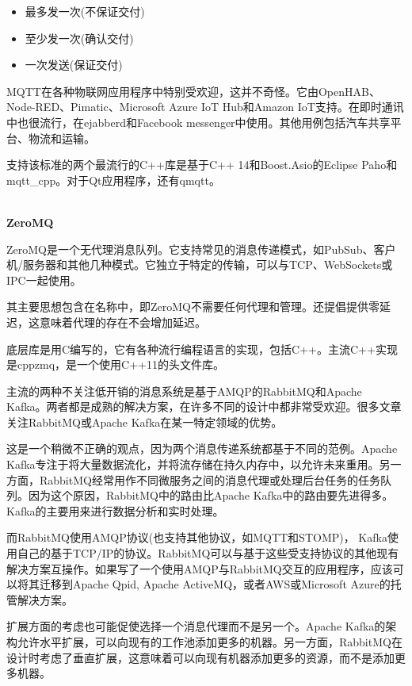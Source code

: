 \begin{itemize}
\item 
最多发一次(不保证交付)

\item 
至少发一次(确认交付)

\item 
一次发送(保证交付)
\end{itemize}

MQTT在各种物联网应用程序中特别受欢迎，这并不奇怪。它由OpenHAB、Node-RED、Pimatic、Microsoft Azure IoT Hub和Amazon IoT支持。在即时通讯中也很流行，在ejabberd和Facebook messenger中使用。其他用例包括汽车共享平台、物流和运输。

支持该标准的两个最流行的C++库是基于C++ 14和Boost.Asio的Eclipse Paho和mqtt\_cpp。对于Qt应用程序，还有qmqtt。

\hspace*{\fill} \\ %
\noindent
\textbf{ZeroMQ}

ZeroMQ是一个无代理消息队列。它支持常见的消息传递模式，如PubSub、客户机/服务器和其他几种模式。它独立于特定的传输，可以与TCP、WebSockets或IPC一起使用。

其主要思想包含在名称中，即ZeroMQ不需要任何代理和管理。还提倡提供零延迟，这意味着代理的存在不会增加延迟。

底层库是用C编写的，它有各种流行编程语言的实现，包括C++。主流C++实现是cppzmq，是一个使用C++11的头文件库。


主流的两种不关注低开销的消息系统是基于AMQP的RabbitMQ和Apache Kafka。两者都是成熟的解决方案，在许多不同的设计中都非常受欢迎。很多文章关注RabbitMQ或Apache Kafka在某一特定领域的优势。

这是一个稍微不正确的观点，因为两个消息传递系统都基于不同的范例。Apache Kafka专注于将大量数据流化，并将流存储在持久内存中，以允许未来重用。另一方面，RabbitMQ经常用作不同微服务之间的消息代理或处理后台任务的任务队列。因为这个原因，RabbitMQ中的路由比Apache Kafka中的路由要先进得多。Kafka的主要用来进行数据分析和实时处理。

而RabbitMQ使用AMQP协议(也支持其他协议，如MQTT和STOMP)， Kafka使用自己的基于TCP/IP的协议。RabbitMQ可以与基于这些受支持协议的其他现有解决方案互操作。如果写了一个使用AMQP与RabbitMQ交互的应用程序，应该可以将其迁移到Apache Qpid, Apache ActiveMQ，或者AWS或Microsoft Azure的托管解决方案。

扩展方面的考虑也可能促使选择一个消息代理而不是另一个。Apache Kafka的架构允许水平扩展，可以向现有的工作池添加更多的机器。另一方面，RabbitMQ在设计时考虑了垂直扩展，这意味着可以向现有机器添加更多的资源，而不是添加更多机器。














